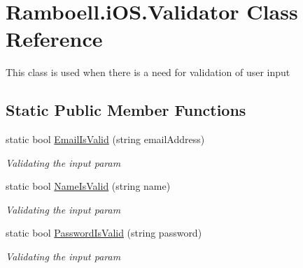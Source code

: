 \hypertarget{class_ramboell_1_1i_o_s_1_1_validator}{}\section{Ramboell.\+i\+O\+S.\+Validator Class Reference}
\label{class_ramboell_1_1i_o_s_1_1_validator}


This class is used when there is a need for validation of user input  


\subsection*{Static Public Member Functions}
\begin{DoxyCompactItemize}
\item 
static bool \hyperlink{class_ramboell_1_1i_o_s_1_1_validator_a4ddde85cd5af147feb9f2a308ea86f47}{Email\+Is\+Valid} (string email\+Address)
\begin{DoxyCompactList}\small\item\em Validating the input param \end{DoxyCompactList}\item 
static bool \hyperlink{class_ramboell_1_1i_o_s_1_1_validator_abb8f8139ece4192da9a9cae822377bcc}{Name\+Is\+Valid} (string name)
\begin{DoxyCompactList}\small\item\em Validating the input param \end{DoxyCompactList}\item 
static bool \hyperlink{class_ramboell_1_1i_o_s_1_1_validator_a0de089b1419ac4021fa74bb450bc6c49}{Password\+Is\+Valid} (string password)
\begin{DoxyCompactList}\small\item\em Validating the input param \end{DoxyCompactList}\end{DoxyCompactItemize}
